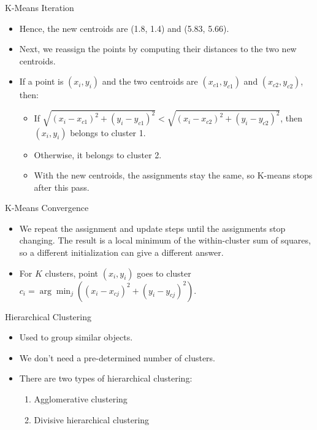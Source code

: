 \documentclass[aspectratio=169,xcolor=dvipsnames,svgnames,x11names,fleqn]{beamer}
\begin{document}
    \begin{frame}{K-Means Iteration}
    \begin{itemize}
        \item Hence, the new centroids are (1.8, 1.4) and (5.83, 5.66).
       \item Next, we reassign the points by computing their distances to the two new centroids.
\item If a point is $(x_i, y_i)$ and the two centroids are $(x_{c1}, y_{c1})$ and $(x_{c2}, y_{c2})$, then:
        \begin{itemize}
        \item If $\sqrt{(x_i - x_{c1})^2 + (y_i - y_{c1})^2} < \sqrt{(x_i - x_{c2})^2 + (y_i - y_{c2})^2}$, then $(x_i, y_i)$ belongs to cluster 1.
        \item Otherwise, it belongs to cluster 2.
        \item With the new centroids, the assignments stay the same, so K-means stops after this pass.
        \end{itemize}
    \end{itemize}
    \end{frame}

    \begin{frame}{K-Means Convergence}
        \begin{itemize}
            \item We repeat the assignment and update steps until the assignments stop changing. The result is a local minimum of the within-cluster sum of squares, so a different initialization can give a different answer.
\item For $K$ clusters, point $(x_i, y_i)$ goes to cluster $c_i = \arg\min_{j} \left( (x_i - x_{cj})^2 + (y_i - y_{cj})^2 \right)$.
        \end{itemize}
    \end{frame}
        
    \begin{frame}{Hierarchical Clustering}
        \begin{itemize}
            \item Used to group similar objects.
            \item We don't need a pre-determined number of clusters.
            \item There are two types of hierarchical clustering:
            \begin{enumerate}
                \item Agglomerative clustering
                \item Divisive hierarchical clustering
            \end{enumerate}
        \end{itemize}
    \end{frame}
\end{document}
